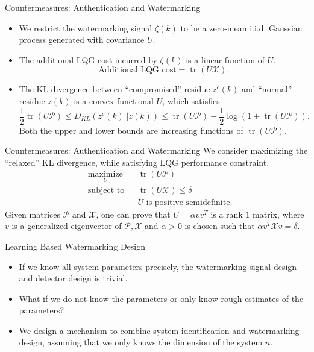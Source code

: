 \documentclass[10pt]{beamer}
\DeclareMathOperator{\tr}{tr}
\begin{document}
  \begin{frame}{Countermeasures: Authentication and Watermarking}
    \begin{itemize}
      \item We restrict the watermarking signal $\zeta(k)$ to be a zero-mean i.i.d. Gaussian process generated with covariance $U$.
      \item The additional LQG cost incurred by $\zeta(k)$ is a linear function of $U$.
	\begin{displaymath}
	  \text{Additional LQG cost} = \tr(U\mathcal X).
	\end{displaymath}
      \item The KL divergence between ``compromised'' residue $z^c(k)$ and ``normal'' residue $z(k)$ is a convex functional $U$, which satisfies
	\begin{displaymath}
	  \frac{1}{2}\tr(U\mathcal P) \leq D_{KL}(z^c(k)||z(k))\leq \tr(U\mathcal P)-\frac{1}{2}\log(1+\tr(U\mathcal P)).
	\end{displaymath}
        Both the upper and lower bounds are increasing functions of $\tr(U\mathcal P)$.
    \end{itemize}
  \end{frame}

  \begin{frame}{Countermeasures: Authentication and Watermarking}
    We consider maximizing the ``relaxed'' KL divergence, while satisfying LQG performance constraint.
    \begin{align*}
      &\mathop{\textrm{maximize}}\limits_{U}&
      & \tr (U\mathcal P)\\
      &\textrm{subject to}&
      & \tr (U\mathcal X) \leq \delta \\
      &&& U \text{ is positive semidefinite.}
    \end{align*}
    Given matrices $\mathcal P$ and $\mathcal X$, one can prove that $U = \alpha v v^T$ is a rank $1$ matrix, where $v$ is a generalized eigenvector of $\mathcal P,\mathcal X$ and $\alpha >0$ is chosen such that $ \alpha v^T\mathcal X v =\delta$.
  \end{frame}

  \begin{frame}{Learning Based Watermarking Design}
    \begin{itemize}
    \item If we know all system parameters precisely, the watermarking signal design and detector design is trivial.
    \item What if we do not know the parameters or only know rough estimates of the parameters?
    \item We design a mechanism to combine system identification and watermarking design, assuming that we only knows the dimension of the system $n$.
    \end{itemize}
  \end{frame}
\end{document}
